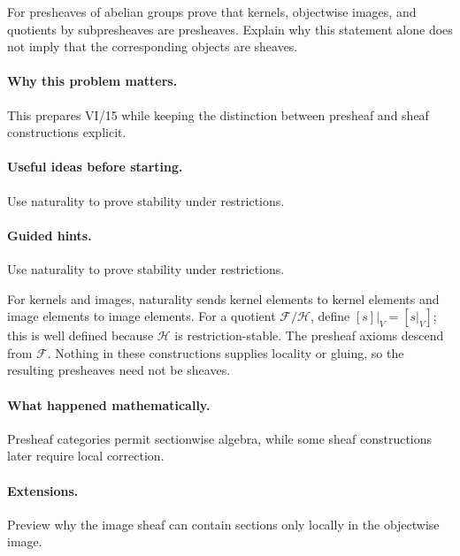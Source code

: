 \begin{problem}
For presheaves of abelian groups prove that kernels, objectwise images, and quotients by subpresheaves are presheaves.  Explain why this statement alone does not imply that the corresponding objects are sheaves.
\end{problem}

\paragraph{Why this problem matters.}
This prepares VI/15 while keeping the distinction between presheaf and sheaf constructions explicit.

\paragraph{Useful ideas before starting.}
Use naturality to prove stability under restrictions.

\paragraph{Guided hints.}
Use naturality to prove stability under restrictions.

\begin{solution}
For kernels and images, naturality sends kernel elements to kernel elements and image elements to image elements.  For a quotient $\mathcal F/\mathcal H$, define $[s]|_V=[s|_V]$; this is well defined because $\mathcal H$ is restriction-stable.  The presheaf axioms descend from $\mathcal F$.  Nothing in these constructions supplies locality or gluing, so the resulting presheaves need not be sheaves.
\end{solution}

\paragraph{What happened mathematically.}
Presheaf categories permit sectionwise algebra, while some sheaf constructions later require local correction.

\paragraph{Extensions.}
Preview why the image sheaf can contain sections only locally in the objectwise image.
